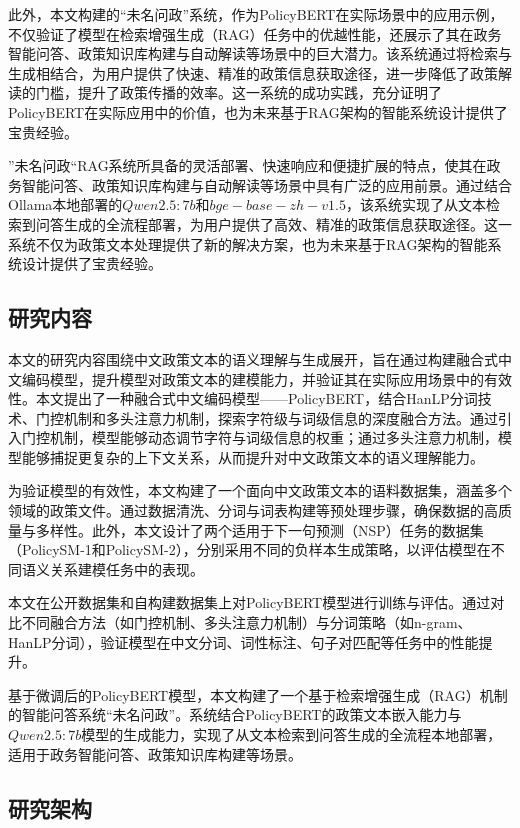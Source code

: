 \documentclass[12pt, a4paper]{ctexart}
\begin{document}
此外，本文构建的“未名问政”系统，作为PolicyBERT在实际场景中的应用示例，不仅验证了模型在检索增强生成（RAG）任务中的优越性能，还展示了其在政务智能问答、政策知识库构建与自动解读等场景中的巨大潜力。该系统通过将检索与生成相结合，为用户提供了快速、精准的政策信息获取途径，进一步降低了政策解读的门槛，提升了政策传播的效率。这一系统的成功实践，充分证明了PolicyBERT在实际应用中的价值，也为未来基于RAG架构的智能系统设计提供了宝贵经验。

”未名问政“RAG系统所具备的灵活部署、快速响应和便捷扩展的特点，使其在政务智能问答、政策知识库构建与自动解读等场景中具有广泛的应用前景。通过结合Ollama本地部署的$Qwen2.5:7b$和$ bge-base-zh-v1.5 $，该系统实现了从文本检索到问答生成的全流程部署，为用户提供了高效、精准的政策信息获取途径。这一系统不仅为政策文本处理提供了新的解决方案，也为未来基于RAG架构的智能系统设计提供了宝贵经验。


\subsection{研究内容}

本文的研究内容围绕中文政策文本的语义理解与生成展开，旨在通过构建融合式中文编码模型，提升模型对政策文本的建模能力，并验证其在实际应用场景中的有效性。本文提出了一种融合式中文编码模型——PolicyBERT，结合HanLP分词技术、门控机制和多头注意力机制，探索字符级与词级信息的深度融合方法。通过引入门控机制，模型能够动态调节字符与词级信息的权重；通过多头注意力机制，模型能够捕捉更复杂的上下文关系，从而提升对中文政策文本的语义理解能力。

为验证模型的有效性，本文构建了一个面向中文政策文本的语料数据集，涵盖多个领域的政策文件。通过数据清洗、分词与词表构建等预处理步骤，确保数据的高质量与多样性。此外，本文设计了两个适用于下一句预测（NSP）任务的数据集（PolicySM-1和PolicySM-2），分别采用不同的负样本生成策略，以评估模型在不同语义关系建模任务中的表现。

本文在公开数据集和自构建数据集上对PolicyBERT模型进行训练与评估。通过对比不同融合方法（如门控机制、多头注意力机制）与分词策略（如n-gram、HanLP分词），验证模型在中文分词、词性标注、句子对匹配等任务中的性能提升。

基于微调后的PolicyBERT模型，本文构建了一个基于检索增强生成（RAG）机制的智能问答系统“未名问政”。系统结合PolicyBERT的政策文本嵌入能力与$Qwen2.5:7b$模型的生成能力，实现了从文本检索到问答生成的全流程本地部署，适用于政务智能问答、政策知识库构建等场景。


\subsection{研究架构}
\end{document}
